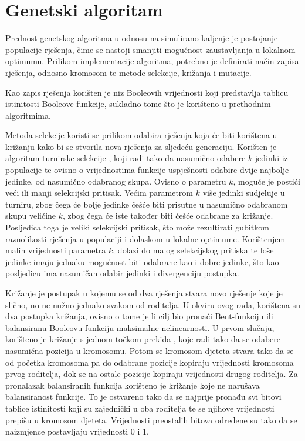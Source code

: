 \section{Genetski algoritam}
Prednost genetskog algoritma u odnosu na simulirano kaljenje je postojanje populacije rješenja, čime se nastoji smanjiti mogućnost zaustavljanja u lokalnom optimumu.
Prilikom implementacije algoritma, potrebno je definirati način zapisa rješenja, odnosno kromosom te metode selekcije, križanja i mutacije.

Kao zapis rješenja korišten je niz Booleovih vrijednosti koji predstavlja tablicu istinitosti Booleove funkcije, sukladno tome što je korišteno u prethodnim algoritmima. 

Metoda selekcije koristi se prilikom odabira rješenja koja će biti korištena u križanju kako bi se stvorila nova rješenja za sljedeću generaciju.
Korišten je algoritam turnirske selekcije \cite{PrirodomInspirirani}, koji radi tako da nasumično odabere $k$ jedinki iz populacije te ovisno o vrijednostima funkcije uspješnosti odabire dvije najbolje jedinke, od nasumično odabranog skupa.
Ovisno o parametru $k$, moguće je postići veći ili manji selekcijski pritisak.
Većim parametrom $k$ više jedinki sudjeluje u turniru, zbog čega će bolje jedinke češće biti prisutne u nasumično odabranom skupu veličine $k$, zbog čega će iste također biti češće odabrane za križanje.
Posljedica toga je veliki selekcijski pritisak, što može rezultirati gubitkom raznolikosti rješenja u populaciji i dolaskom u lokalne optimume.
Korištenjem malih vrijednosti parametra $k$, dolazi do malog selekcijskog pritiska te loše jedinke imaju jednaku mogućnost biti odabrane kao i dobre jedinke, što kao posljedicu ima nasumičan odabir jedinki i divergenciju postupka.

Križanje je postupak u kojemu se od dva rješenja stvara novo rješenje koje je slično, no ne nužno jednako svakom od roditelja.
U okviru ovog rada, korištena su dva postupka križanja, ovisno o tome je li cilj bio pronaći Bent-funkciju ili balansiranu Booleovu funkciju maksimalne nelinearnosti.
U prvom slučaju, korišteno je križanje s jednom točkom prekida \cite{PrirodomInspirirani}, koje radi tako da se odabere nasumična pozicija u kromosomu.
Potom se kromosom djeteta stvara tako da se od početka kromosoma pa do odabrane pozicije kopiraju vrijednosti kromosoma prvog roditelja, dok se na ostale pozicije kopiraju vrijednosti drugog roditelja.
Za pronalazak balansiranih funkcija korišteno je križanje koje ne narušava balansiranost funkcije.
To je ostvareno tako da se najprije pronađu svi bitovi tablice istinitosti koji su zajednički u oba roditelja te se njihove vrijednosti prepišu u kromosom djeteta.
Vrijednosti preostalih bitova određene su tako da se naizmjence postavljaju vrijednosti $0$ i $1$.

